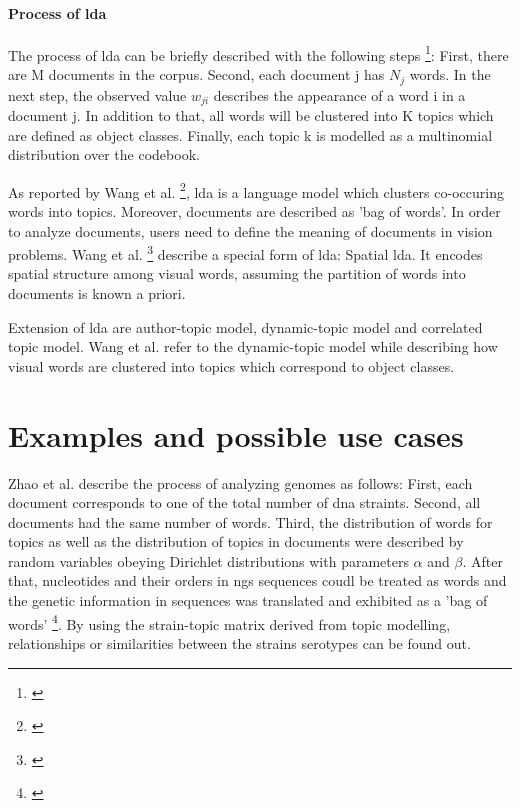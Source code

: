 {{{\paragraph{Process of \gls{lda}}

The process of \gls{lda} can be briefly described with the following steps \footnote{\autocite{wang_2008}}: First, there are M documents in the corpus. Second, each document j has \(N_{j}\) words. In the next step, the observed value \(w_{ji}\) describes the appearance of a word i in a document j. In addition to that, all words will be clustered into K topics which are defined as object classes. Finally, each topic k is modelled as a multinomial distribution over the codebook.

As reported by Wang et al. \footnote{\autocite{wang_2008}}, \gls{lda} is a language model which clusters co-occuring words into topics. Moreover, documents are described as 'bag of words'. In order to analyze documents, users need to define the meaning of documents in vision problems. 
Wang et al. \footnote{\autocite{wang_2008}} describe a special form of \gls{lda}: Spatial \gls{lda}. It encodes spatial structure among visual words, assuming the partition of words into documents is known a priori. 

Extension of \gls{lda} are author-topic model, dynamic-topic model and correlated topic model. Wang et al. refer to the dynamic-topic model while describing how visual words are clustered into topics which correspond to object classes.
 
\section{Examples and possible use cases}\label{lda_examples}

Zhao et al. describe the process of analyzing genomes as follows: First, each document corresponds to one of the total number of \gls{dna} straints. Second, all documents had the same number of words. Third, the distribution of words for topics as well as the distribution of topics in documents were described by random variables obeying Dirichlet distributions with parameters $\alpha$ and $\beta$. After that, nucleotides and their orders in \gls{ngs} sequences coudl be treated as words and the genetic information in sequences was translated and exhibited as a 'bag of words'  \footnote{\autocite{zhao_2016}}. By using the strain-topic matrix derived from topic modelling, relationships or similarities between the strains serotypes can be found out. 

}}}
